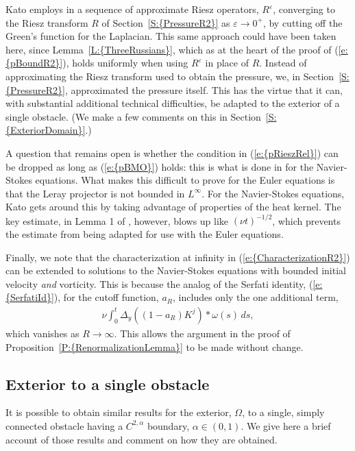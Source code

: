 \documentclass[reqno,openright,11pt,twoside]{amsart}
\theoremstyle{definition}
\numberwithin{equation}{section}
\begin{document}
Kato employs in \cite{JunKato2003} a sequence of approximate Riesz operators, $R^{\ensuremath{\varepsilon}}$, converging to the Riesz transform $R$ of {Section~\ref{S:{PressureR2}}} as ${\ensuremath{\varepsilon}} \to 0^+$, by cutting off the Green's function for the Laplacian. This same approach could have been taken here, since {Lemma~\ref{L:{ThreeRussians}}}, which as at the heart of the proof of {(\ref{e:{pBoundR2}})}, holds uniformly when using $R^{\ensuremath{\varepsilon}}$ in place of $R$. Instead of approximating the Riesz transform used to obtain the pressure, we, in {Section~\ref{S:{PressureR2}}}, approximated the pressure itself. This has the virtue that it can, with substantial additional technical difficulties, be adapted to the exterior of a single obstacle. (We make a few comments on this in {Section~\ref{S:{ExteriorDomain}}}.)

A question that remains open is whether the condition in {(\ref{e:{pRieszRel}})} can be dropped as long as {(\ref{e:{pBMO}})} holds: this is what is done in \cite{JunKato2003} for the Navier-Stokes equations. What makes this difficult to prove for the Euler equations is that the Leray projector is not bounded in $L^{\ensuremath{\infty}}$. For the Navier-Stokes equations, Kato gets around this by taking advantage of properties of the heat kernel. The key estimate, in Lemma 1 of \cite{JunKato2003}, however, blows up like $(\nu t)^{-1/2}$, which prevents the estimate from being adapted for use with the Euler equations.

Finally, we note that the characterization at infinity in {(\ref{e:{CharacterizationR2}})} can be extended to solutions to the Navier-Stokes equations with bounded initial velocity \textit{and} vorticity. This is because the analog of the Serfati identity, {(\ref{e:{SerfatiId}})}, for the cutoff function, $a_R$, includes only the one additional term,
\begin{align*}
    \nu \int_0^t \Delta_y
			       {\ensuremath{\left( {(1 - a_R) K^j} \right) }} * \omega(s) \, ds,
\end{align*}
which vanishes as $R \to {\ensuremath{\infty}}$. This allows the argument in the proof of {Proposition~\ref{P:{RenormalizationLemma}}} to be made without change.

\subsection{Exterior to a single obstacle}\label{S:ExteriorDomain}

\noindent It is possible to obtain similar results for the exterior, $\Omega$, to a single, simply connected obstacle having a $C^{2, {\ensuremath{\alpha}}}$ boundary, ${\ensuremath{\alpha}} \in (0, 1)$. We give here a brief account of those results and comment on how they are obtained.
\end{document}

